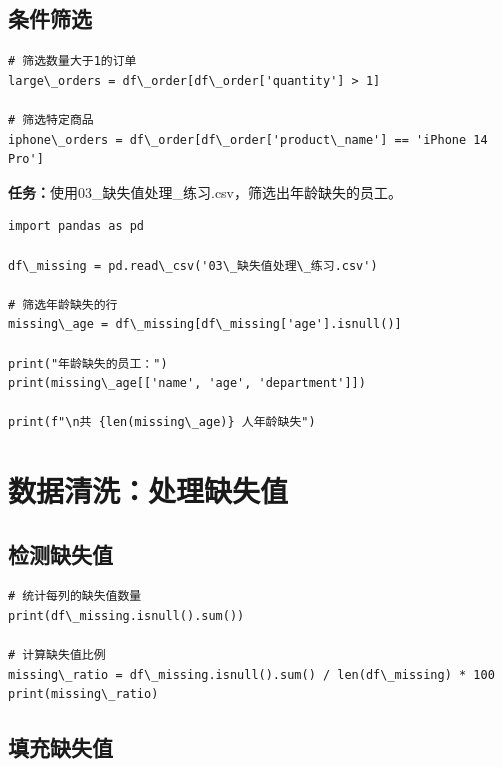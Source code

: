 \documentclass[12pt,a4paper]{article}
\begin{document}
\subsection{条件筛选}

\begin{lstlisting}[caption={条件筛选示例}]
# 筛选数量大于1的订单
large\_orders = df\_order[df\_order['quantity'] > 1]

# 筛选特定商品
iphone\_orders = df\_order[df\_order['product\_name'] == 'iPhone 14 Pro']
\end{lstlisting}

\begin{practicebox}
\textbf{任务：}使用03\_缺失值处理\_练习.csv，筛选出年龄缺失的员工。

\begin{lstlisting}
import pandas as pd

df\_missing = pd.read\_csv('03\_缺失值处理\_练习.csv')

# 筛选年龄缺失的行
missing\_age = df\_missing[df\_missing['age'].isnull()]

print("年龄缺失的员工：")
print(missing\_age[['name', 'age', 'department']])

print(f"\n共 {len(missing\_age)} 人年龄缺失")
\end{lstlisting}
\end{practicebox}

\section{数据清洗：处理缺失值}

\subsection{检测缺失值}

\begin{lstlisting}[caption={检测缺失值}]
# 统计每列的缺失值数量
print(df\_missing.isnull().sum())

# 计算缺失值比例
missing\_ratio = df\_missing.isnull().sum() / len(df\_missing) * 100
print(missing\_ratio)
\end{lstlisting}

\subsection{填充缺失值}
\end{document}
